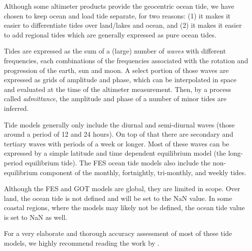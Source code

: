 \documentclass[a4paper,11pt,openany,natbib,nomargin]{thesis}
\begin{document}
Although some altimeter products provide the geocentric ocean tide, we have chosen to keep ocean and load tide separate, for two reasons: (1) it makes it easier to differentiate tides over land/lakes and ocean, and (2) it makes it easier to add regional tides which are generally expressed as pure ocean tides.

Tides are expressed as the sum of a (large) number of \emph{waves} with different frequencies, each combinations of the frequencies associated with the rotation and progression of the earth, sun and moon. A select portion of those waves are expressed as grids of amplitude and phase, which can be interpolated in space and evaluated at the time of the altimeter measurement. Then, by a process called \emph{admittance}, the amplitude and phase of a number of minor tides are inferred.

Tide models generally only include the diurnal and semi-diurnal waves (those around a period of 12 and 24 hours). On top of that there are secondary and tertiary waves with periods of a week or longer. Most of these waves can be expressed by a simple latitude and time dependent equilibrium model (the long-period equilibrium tide). The FES ocean tide models also include the non-equilibrium component of the monthly, fortnightly, tri-monthly, and weekly tides.

Although the FES and GOT models are global, they are limited in scope. Over land, the ocean tide is not defined and will be set to the NaN value. In some coastal regions, where the models may likely not be defined, the ocean tide value is set to NaN as well.

For a very elaborate and thorough accuracy assessment of most of these tide models, we highly recommend reading the work by \citet{stammer2014}.
\end{document}
